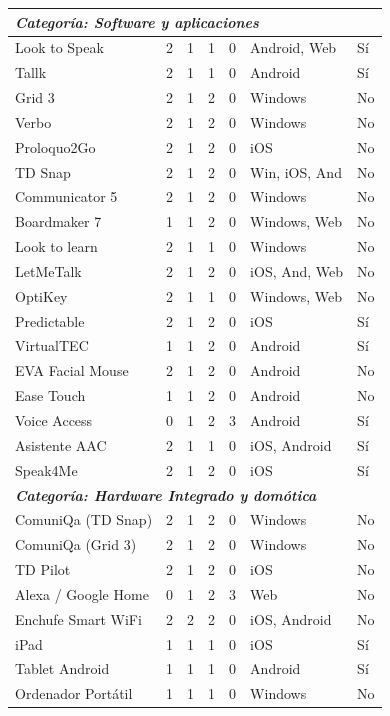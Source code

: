 \begin{small}
\begin{longtable}{p{4cm}cccc p{4cm} l}
    \multicolumn{7}{l}{\textit{\textbf{Categoría: Software y aplicaciones}}} \\
    \midrule
    Look to Speak & 2 & 1 & 1 & 0 & Android, Web & Sí \\
    Tallk & 2 & 1 & 1 & 0 & Android & Sí \\
    Grid 3 & 2 & 1 & 2 & 0 & Windows & No \\
    Verbo & 2 & 1 & 2 & 0 & Windows & No \\
    Proloquo2Go & 2 & 1 & 2 & 0 & iOS & No \\
    TD Snap & 2 & 1 & 2 & 0 & Win, iOS, And & No \\
    Communicator 5 & 2 & 1 & 2 & 0 & Windows & No \\
    Boardmaker 7 & 1 & 1 & 2 & 0 & Windows, Web & No \\
    Look to learn & 2 & 1 & 1 & 0 & Windows & No \\
    LetMeTalk & 2 & 1 & 2 & 0 & iOS, And, Web & No \\
    OptiKey & 2 & 1 & 1 & 0 & Windows, Web & No \\
    Predictable & 2 & 1 & 2 & 0 & iOS & Sí \\
    VirtualTEC & 1 & 1 & 2 & 0 & Android & Sí \\
    EVA Facial Mouse & 2 & 1 & 2 & 0 & Android & No \\
    Ease Touch & 1 & 1 & 2 & 0 & Android & No \\
    Voice Access & 0 & 1 & 2 & 3 & Android & Sí \\
    Asistente AAC & 2 & 1 & 1 & 0 & iOS, Android & Sí \\
    Speak4Me & 2 & 1 & 2 & 0 & iOS & Sí \\
    \midrule

    \multicolumn{7}{l}{\textit{\textbf{Categoría: Hardware Integrado y domótica}}} \\
    \midrule
    ComuniQa (TD Snap) & 2 & 1 & 2 & 0 & Windows & No \\
    ComuniQa (Grid 3) & 2 & 1 & 2 & 0 & Windows & No \\
    TD Pilot & 2 & 1 & 2 & 0 & iOS & No \\
    Alexa / Google Home & 0 & 1 & 2 & 3 & Web & No \\
    Enchufe Smart WiFi & 2 & 2 & 2 & 0 & iOS, Android & No \\
    iPad & 1 & 1 & 1 & 0 & iOS & Sí \\
    Tablet Android & 1 & 1 & 1 & 0 & Android & Sí \\
    Ordenador Portátil & 1 & 1 & 1 & 0 & Windows & No \\
    \midrule


\end{longtable}
\end{small}
